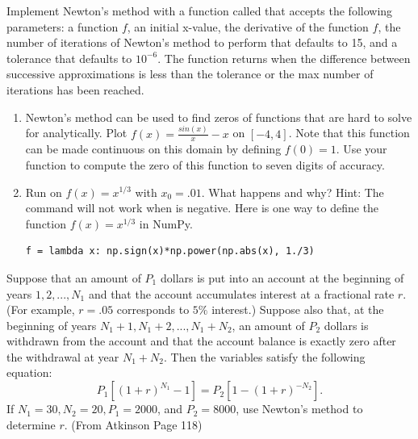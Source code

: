 \begin{problem}
\label{prob:newton_arr}
\leavevmode

Implement Newton's method with a function called  that accepts the following parameters: a function $f$, an initial x-value, the derivative of the function $f$, the number of iterations of Newton's method to perform that defaults to 15, and a tolerance that defaults to $10^{-6}$.  
The function  returns when the difference between successive approximations is less than the tolerance or the max number of iterations has been reached.
\end{problem}

\begin{problem}
\begin{enumerate}
\label{prob:functions}

\item Newton's method can be used to find zeros of functions that are hard to solve for analytically.
Plot $f(x) = \frac{sin(x)}{x}-x$ on $[-4, 4]$. 
Note that this function can be made continuous on this domain by defining $f(0)=1$. 
Use your function  to compute the zero of this function to seven digits of accuracy.
\item Run  on $f(x)=x^{1/3}$ with $x_0=.01$. 
What happens and why?
Hint: The command  will not work when  is negative. 
Here is one way to define the function $f(x)=x^{1/3}$ in NumPy.
\begin{lstlisting}
f = lambda x: np.sign(x)*np.power(np.abs(x), 1./3)
\end{lstlisting}
\end{enumerate}
\end{problem}

\begin{problem}
Suppose that an amount of $P_1$ dollars is put into an account at the beginning of years $1, 2,..., N_1$ and that the account accumulates interest at a fractional rate $r$.  
(For example, $r = .05$ corresponds to $5\%$ interest.) 
Suppose also that, at the beginning of years $N_1 + 1, N_1 + 2, ..., N_1 + N_2$, an amount of $P_2$ dollars is withdrawn from the account and that the account balance is exactly zero after the withdrawal at year $N_1 + N_2$.
Then the variables satisfy the following equation:
\[
P_1[(1+r)^{N_1} - 1] = P_2[1-(1+r)^{-N_2}].
\]
If $N_1 =30, N_2 =20, P_1 =2000$, and $P_2 =8000$, use Newton's method to
determine $r$.
(From Atkinson Page 118)
\end{problem}

